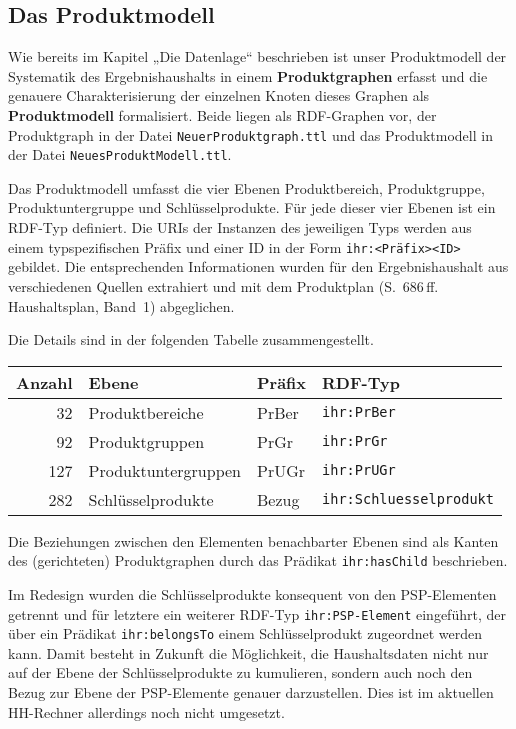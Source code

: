\documentclass[a4paper,11pt,twoside]{article}
\begin{document}
\subsection{Das Produktmodell}

Wie bereits im Kapitel „Die Datenlage“ beschrieben ist unser Produktmodell der
Systematik des Ergebnishaushalts in einem \textbf{Produktgraphen} erfasst und
die genauere Charakterisierung der einzelnen Knoten dieses Graphen als
\textbf{Produktmodell} formalisiert.  Beide liegen als RDF-Graphen vor, der
Produktgraph in der Datei \texttt{NeuerProduktgraph.ttl} und das Produktmodell
in der Datei \texttt{NeuesProduktModell.ttl}.

Das Produktmodell umfasst die vier Ebenen Produktbereich, Produktgruppe,
Produktuntergruppe und Schlüsselprodukte.  Für jede dieser vier Ebenen ist ein
RDF-Typ definiert. Die URIs der Instanzen des jeweiligen Typs werden aus einem
typspezifischen Präfix und einer ID in der Form \texttt{ihr:<Präfix><ID>}
gebildet.  Die entsprechenden Informationen wurden für den Ergebnishaushalt
aus verschiedenen Quellen extrahiert und mit dem Produktplan
(S.~686\,ff. Haushaltsplan, Band~1) abgeglichen.

Die Details sind in der folgenden Tabelle zusammengestellt.
\begin{center}
  \begin{tabular}{rlll}
    Anzahl & Ebene & Präfix & RDF-Typ \\\hline
    32 & Produktbereiche & PrBer & \texttt{ihr:PrBer}\\
    92 & Produktgruppen & PrGr & \texttt{ihr:PrGr} \\
    127 & Produktuntergruppen & PrUGr & \texttt{ihr:PrUGr} \\
    282 & Schlüsselprodukte & Bezug & \texttt{ihr:Schluesselprodukt}\\
  \end{tabular}
\end{center}
Die Beziehungen zwischen den Elementen benachbarter Ebenen sind als Kanten des
(gerichteten) Produktgraphen durch das Prädikat \texttt{ihr:hasChild}
beschrieben.

Im Redesign wurden die Schlüsselprodukte konsequent von den PSP-Elementen
getrennt und für letztere ein weiterer RDF-Typ \texttt{ihr:PSP-Element}
eingeführt, der über ein Prädikat \texttt{ihr:belongsTo} einem Schlüsselprodukt
zugeordnet werden kann.  Damit besteht in Zukunft die Möglichkeit, die
Haushaltsdaten nicht nur auf der Ebene der Schlüsselprodukte zu kumulieren,
sondern auch noch den Bezug zur Ebene der PSP-Elemente genauer darzustellen.
Dies ist im aktuellen HH-Rechner allerdings noch nicht umgesetzt. 
\end{document}
